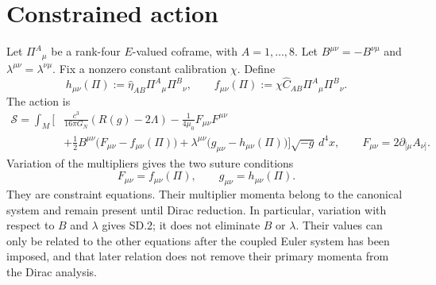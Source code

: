 \documentclass[10pt]{article}
\newcommand{\hateta}{\widehat\eta}
\newcommand{\hatC}{\widehat C}
\begin{document}

\begin{abstract}
The suture field supplies an eight-dimensional internal carrier for a
Lorentzian metric and an antisymmetric flux form. This note gives the exact
condition under which its multiplier action has the same propagating content
as Einstein--Maxwell theory. The condition is the rank-sixteen regularity of
the pointwise suture map from the thirty-two coframe coordinates to the ten
metric and six flux coordinates. On that branch the remaining sixteen coframe
coordinates are vertical gauge coordinates; the multiplier sector is
second-class; and the reduced Hamiltonian carries two gravitational and two
electromagnetic polarizations. The reduced theory is Einstein--Maxwell on the
domain where the rest-frame magnetic invariant of the flux is below the
calibration, $b<|\chi|$; the electric invariant is unbounded.
\end{abstract}

\section{Constrained action}

Let $\Pi^A{}_{\mu}$ be a rank-four $E$-valued coframe, with $A=1,\ldots,8$.
Let $B^{\mu\nu}=-B^{\nu\mu}$ and
$\lambda^{\mu\nu}=\lambda^{\nu\mu}$. Fix a nonzero constant calibration
$\chi$. Define
\[
h_{\mu\nu}(\Pi):=\hateta_{AB}\Pi^A{}_{\mu}\Pi^B{}_{\nu},
\qquad
f_{\mu\nu}(\Pi):=\chi\hatC_{AB}\Pi^A{}_{\mu}\Pi^B{}_{\nu}.
\tag{SD.0}
\]
The action is
\[
\begin{aligned}
\mathcal S=\int_M\Bigg[&\frac{c^3}{16\pi G_N}(R(g)-2\Lambda)
-\frac1{4\mu_0}F_{\mu\nu}F^{\mu\nu}\\
&+\frac12B^{\mu\nu}\bigl(F_{\mu\nu}-f_{\mu\nu}(\Pi)\bigr)
+\lambda^{\mu\nu}\bigl(g_{\mu\nu}-h_{\mu\nu}(\Pi)\bigr)\Bigg]
\sqrt{-g}\,d^4x,
\qquad F_{\mu\nu}=2\partial_{[\mu}A_{\nu]}.
\end{aligned}
\tag{SD.1}
\]
Variation of the multipliers gives the two suture conditions
\[
F_{\mu\nu}=f_{\mu\nu}(\Pi),
\qquad g_{\mu\nu}=h_{\mu\nu}(\Pi).
\tag{SD.2}
\]
They are constraint equations. Their multiplier momenta belong to the
canonical system and remain present until Dirac reduction.
In particular, variation with respect to $B$ and $\lambda$ gives SD.2;
it does not eliminate $B$ or $\lambda$. Their values can only be related to
the other equations after the coupled Euler system has been imposed, and
that later relation does not remove their primary momenta from the Dirac
analysis.
\end{document}
